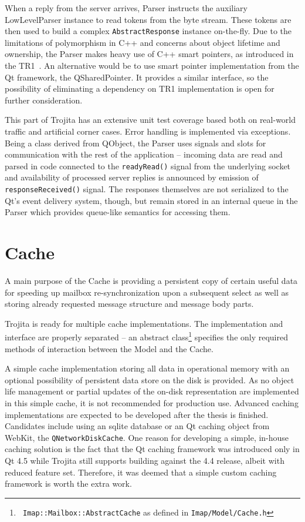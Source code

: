 \documentclass[12pt,notitlepage]{report}
\newcommand{\trojita}{Trojita\xspace}
\begin{document}
When a reply from the server arrives, Parser instructs the auxiliary
LowLevelParser instance to read tokens from the byte stream.  These tokens are
then used to build a complex {\tt AbstractResponse} instance on-the-fly.  Due to
the limitations of polymorphism in C++ and concerns about object lifetime and
ownership, the Parser makes heavy use of C++ smart pointers, as introduced in
the TR1~\cite{std-tr1}.  An alternative would be to use smart pointer
implementation from the Qt framework, the QSharedPointer.  It provides a similar
interface, so the possibility of eliminating a dependency on TR1 implementation
is open for further consideration.

This part of \trojita has an extensive unit test coverage based both on
real-world traffic and artificial corner cases.  Error handling is implemented
via exceptions.  Being a class derived from QObject, the Parser uses signals and
slots for communication with the rest of the application -- incoming data are
read and parsed in code connected to the {\tt readyRead()} signal from the
underlying socket and availability of processed server replies is announced by
emission of {\tt responseReceived()} signal.  The responses themselves are not
serialized to the Qt's event delivery system, though, but remain stored in an
internal queue in the Parser which provides queue-like semantics for accessing
them.

\section{Cache}

A main purpose of the Cache is providing a persistent copy of certain useful
data for speeding up mailbox re-synchronization upon a subsequent select as well
as storing already requested message structure and message body parts.

\trojita is ready for multiple cache implementations.  The implementation and
interface are properly separated -- an abstract class\footnote{{\tt
Imap::Mailbox::AbstractCache} as defined in {\tt Imap/Model/Cache.h}} specifies
the only required methods of interaction between the Model and the Cache.

A simple cache implementation storing all data in operational memory with an
optional possibility of persistent data store on the disk is provided.  As no
object life management or partial updates of the on-disk representation are
implemented in this simple cache, it is not recommended for production use.
Advanced caching implementations are expected to be developed after the thesis
is finished.  Candidates include using an sqlite database or an Qt caching
object from WebKit, the {\tt QNetworkDiskCache}.  One reason for developing a
simple, in-house caching solution is the fact that the Qt caching framework was
introduced only in Qt 4.5 while \trojita still supports building against the 4.4
release, albeit with reduced feature set.  Therefore, it was deemed that a
simple custom caching framework is worth the extra work.
\end{document}

